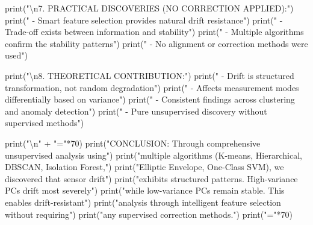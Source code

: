 \documentclass[
  letterpaper,
  DIV=11,
  numbers=noendperiod]{scrartcl}
\newenvironment{Shaded}{\begin{snugshade}}{\end{snugshade}}
\newcommand{\BuiltInTok}[1]{\textcolor[rgb]{0.00,0.23,0.31}{#1}}
\newcommand{\CharTok}[1]{\textcolor[rgb]{0.13,0.47,0.30}{#1}}
\newcommand{\DecValTok}[1]{\textcolor[rgb]{0.68,0.00,0.00}{#1}}
\newcommand{\NormalTok}[1]{\textcolor[rgb]{0.00,0.23,0.31}{#1}}
\newcommand{\OperatorTok}[1]{\textcolor[rgb]{0.37,0.37,0.37}{#1}}
\newcommand{\StringTok}[1]{\textcolor[rgb]{0.13,0.47,0.30}{#1}}
\renewenvironment{Shaded}{%
  \begin{tcolorbox}[%
    enhanced,%
    colback=codebg,%
    colframe=codebg,%
    borderline west={3pt}{0pt}{sectionblue},%
    fontupper=\small\ttfamily,%
    boxrule=0pt,%
    arc=0pt,%
    boxsep=5pt,%
    left=2mm,%
    right=2mm,%
    top=2mm,%
    bottom=2mm%
  ]%
}{%
  \end{tcolorbox}%
}
\begin{document}
\begin{Shaded}
\begin{Highlighting}[]
\BuiltInTok{print}\NormalTok{(}\StringTok{"}\CharTok{\textbackslash{}n}\StringTok{7. PRACTICAL DISCOVERIES (NO CORRECTION APPLIED):"}\NormalTok{)}
\BuiltInTok{print}\NormalTok{(}\StringTok{"   {-} Smart feature selection provides natural drift resistance"}\NormalTok{)}
\BuiltInTok{print}\NormalTok{(}\StringTok{"   {-} Trade{-}off exists between information and stability"}\NormalTok{)}
\BuiltInTok{print}\NormalTok{(}\StringTok{"   {-} Multiple algorithms confirm the stability patterns"}\NormalTok{)}
\BuiltInTok{print}\NormalTok{(}\StringTok{"   {-} No alignment or correction methods were used"}\NormalTok{)}

\BuiltInTok{print}\NormalTok{(}\StringTok{"}\CharTok{\textbackslash{}n}\StringTok{8. THEORETICAL CONTRIBUTION:"}\NormalTok{)}
\BuiltInTok{print}\NormalTok{(}\StringTok{"   {-} Drift is structured transformation, not random degradation"}\NormalTok{)}
\BuiltInTok{print}\NormalTok{(}\StringTok{"   {-} Affects measurement modes differentially based on variance"}\NormalTok{)}
\BuiltInTok{print}\NormalTok{(}\StringTok{"   {-} Consistent findings across clustering and anomaly detection"}\NormalTok{)}
\BuiltInTok{print}\NormalTok{(}\StringTok{"   {-} Pure unsupervised discovery without supervised methods"}\NormalTok{)}

\BuiltInTok{print}\NormalTok{(}\StringTok{"}\CharTok{\textbackslash{}n}\StringTok{"} \OperatorTok{+} \StringTok{"="}\OperatorTok{*}\DecValTok{70}\NormalTok{)}
\BuiltInTok{print}\NormalTok{(}\StringTok{"CONCLUSION: Through comprehensive unsupervised analysis using"}\NormalTok{)}
\BuiltInTok{print}\NormalTok{(}\StringTok{"multiple algorithms (K{-}means, Hierarchical, DBSCAN, Isolation Forest,"}\NormalTok{)}
\BuiltInTok{print}\NormalTok{(}\StringTok{"Elliptic Envelope, One{-}Class SVM), we discovered that sensor drift"}\NormalTok{)}
\BuiltInTok{print}\NormalTok{(}\StringTok{"exhibits structured patterns. High{-}variance PCs drift most severely"}\NormalTok{)}
\BuiltInTok{print}\NormalTok{(}\StringTok{"while low{-}variance PCs remain stable. This enables drift{-}resistant"}\NormalTok{)}
\BuiltInTok{print}\NormalTok{(}\StringTok{"analysis through intelligent feature selection without requiring"}\NormalTok{)}
\BuiltInTok{print}\NormalTok{(}\StringTok{"any supervised correction methods."}\NormalTok{)}
\BuiltInTok{print}\NormalTok{(}\StringTok{"="}\OperatorTok{*}\DecValTok{70}\NormalTok{)}
\end{Highlighting}
\end{Shaded}
\end{document}
